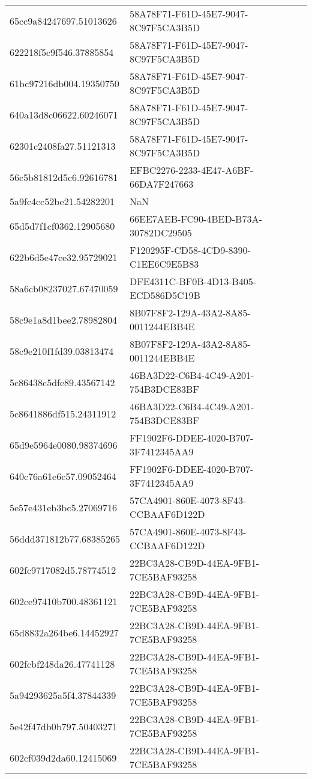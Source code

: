 \begin{tabular}{ll}
65cc9a84247697.51013626 & 58A78F71-F61D-45E7-9047-8C97F5CA3B5D \\
622218f5c9f546.37885854 & 58A78F71-F61D-45E7-9047-8C97F5CA3B5D \\
61bc97216db004.19350750 & 58A78F71-F61D-45E7-9047-8C97F5CA3B5D \\
640a13d8c06622.60246071 & 58A78F71-F61D-45E7-9047-8C97F5CA3B5D \\
62301c2408fa27.51121313 & 58A78F71-F61D-45E7-9047-8C97F5CA3B5D \\
56c5b81812d5c6.92616781 & EFBC2276-2233-4E47-A6BF-66DA7F247663 \\
5a9fc4cc52be21.54282201 & NaN \\
65d5d7f1cf0362.12905680 & 66EE7AEB-FC90-4BED-B73A-30782DC29505 \\
622b6d5e47ce32.95729021 & F120295F-CD58-4CD9-8390-C1EE6C9E5B83 \\
58a6cb08237027.67470059 & DFE4311C-BF0B-4D13-B405-ECD586D5C19B \\
58c9e1a8d1bee2.78982804 & 8B07F8F2-129A-43A2-8A85-0011244EBB4E \\
58c9e210f1fd39.03813474 & 8B07F8F2-129A-43A2-8A85-0011244EBB4E \\
5c86438c5dfe89.43567142 & 46BA3D22-C6B4-4C49-A201-754B3DCE83BF \\
5c8641886df515.24311912 & 46BA3D22-C6B4-4C49-A201-754B3DCE83BF \\
65d9e5964e0080.98374696 & FF1902F6-DDEE-4020-B707-3F7412345AA9 \\
640c76a61e6c57.09052464 & FF1902F6-DDEE-4020-B707-3F7412345AA9 \\
5e57e431eb3bc5.27069716 & 57CA4901-860E-4073-8F43-CCBAAF6D122D \\
56ddd371812b77.68385265 & 57CA4901-860E-4073-8F43-CCBAAF6D122D \\
602fc9717082d5.78774512 & 22BC3A28-CB9D-44EA-9FB1-7CE5BAF93258 \\
602ce97410b700.48361121 & 22BC3A28-CB9D-44EA-9FB1-7CE5BAF93258 \\
65d8832a264be6.14452927 & 22BC3A28-CB9D-44EA-9FB1-7CE5BAF93258 \\
602fcbf248da26.47741128 & 22BC3A28-CB9D-44EA-9FB1-7CE5BAF93258 \\
5a94293625a5f4.37844339 & 22BC3A28-CB9D-44EA-9FB1-7CE5BAF93258 \\
5e42f47db0b797.50403271 & 22BC3A28-CB9D-44EA-9FB1-7CE5BAF93258 \\
602cf039d2da60.12415069 & 22BC3A28-CB9D-44EA-9FB1-7CE5BAF93258 \\

\end{tabular}
